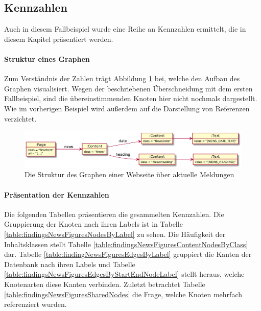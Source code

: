 \subsection{Kennzahlen}
    Auch in diesem Fallbeispiel wurde eine Reihe an Kennzahlen ermittelt,
    die in diesem Kapitel präsentiert werden.

    \paragraph{Struktur eines Graphen}
    Zum Verständnis der Zahlen trägt Abbildung \ref{image:findingNewsFiguresDbModel} bei,
    welche den Aufbau des Graphen visualisiert.
    Wegen der beschriebenen Überschneidung mit dem ersten Fallbeispiel,
    sind die übereinstimmenden Knoten hier nicht nochmals dargestellt.
    Wie im vorherigen Beispiel wird außerdem auf die Darstellung von
    Referenzen verzichtet.

    \begin{figure}[htb]
        \centering
        \includegraphics[scale=\imageScalingFactor]{../resources/findings/case-study-2/dbmodel.png}
        \caption{Die Struktur des Graphen einer Webseite über aktuelle Meldungen}
        \label{image:findingNewsFiguresDbModel}
    \end{figure}

    \paragraph{Präsentation der Kennzahlen}
    Die folgenden Tabellen präsentieren die gesammelten Kennzahlen.
    Die Gruppierung der Knoten nach ihren Labels ist in Tabelle
    \ref{table:findingsNewsFiguresNodesByLabel} zu sehen.
    Die Häufigkeit der Inhaltsklassen stellt Tabelle
    \ref{table:findingsNewsFiguresContentNodesByClass} dar.
    Tabelle \ref{table:findingNewsFiguresEdgesByLabel} gruppiert die Kanten der Datenbank
    nach ihren Labels und Tabelle
    \ref{table:findingsNewsFiguresEdgesByStartEndNodeLabel}
    stellt heraus, welche Knotenarten diese Kanten verbinden.
    Zuletzt betrachtet Tabelle \ref{table:findingsNewsFiguresSharedNodes}
    die Frage, welche Knoten mehrfach referenziert wurden.

